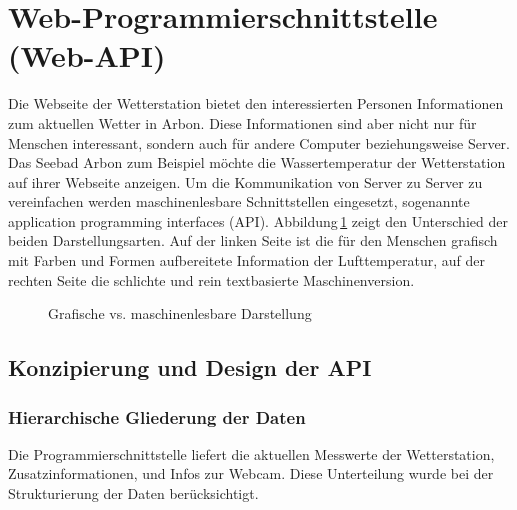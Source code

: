 \section{ Web-Programmierschnittstelle (Web-API)}
Die Webseite der Wetterstation bietet den interessierten Personen Informationen zum aktuellen Wetter in Arbon. Diese Informationen sind aber nicht nur für Menschen interessant, sondern auch für andere Computer beziehungsweise Server. Das Seebad Arbon zum Beispiel möchte die Wassertemperatur der Wetterstation auf ihrer Webseite anzeigen. Um die Kommunikation von Server zu Server zu vereinfachen werden maschinenlesbare Schnittstellen eingesetzt, sogenannte application programming interfaces (API). Abbildung\,\ref{img:humanvsmachine} zeigt den Unterschied der beiden Darstellungsarten. Auf der linken Seite ist die für den Menschen grafisch mit Farben und Formen aufbereitete Information der Lufttemperatur, auf der rechten Seite die schlichte und rein textbasierte Maschinenversion.

\begin{figure}[htbp!]
	\centering
	\caption{Grafische vs. maschinenlesbare Darstellung}
	\label{img:humanvsmachine}
\end{figure}

\subsection{Konzipierung und Design der API}


\subsubsection{Hierarchische Gliederung der Daten}
Die Programmierschnittstelle liefert die aktuellen Messwerte der Wetterstation, Zusatzinformationen, und Infos zur Webcam. Diese Unterteilung wurde bei der Strukturierung der Daten berücksichtigt.

